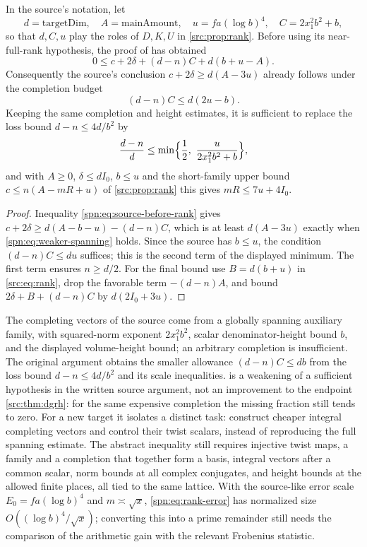\begin{proposition}\label{spn:prop:weakening}
In the source's notation, let
\[
 d=\mathrm{targetDim},\quad A=\mathrm{mainAmount},\quad u=fa(\log b)^4,\quad
 C=2x_1^2b^2+b ,
\]
so that $d,C,u$ play the roles of $D,K,U$ in \cref{src:prop:rank}.
Before using its near-full-rank hypothesis, the proof of
\textup{} has obtained
\begin{equation}\label{spn:eq:source-before-rank}
 0\le c+2\delta+(d-n)C+d(b+u-A).
\end{equation}
Consequently the source's conclusion $c+2\delta\ge d(A-3u)$ already follows
under the completion budget
\begin{equation}\label{spn:eq:weaker-spanning}
 (d-n)C\le d(2u-b).
\end{equation}
Keeping the same completion and height estimates, it is sufficient to replace
the loss bound $d-n\le4d/b^2$ by
\[
 \frac{d-n}{d}\le\min\Bigl\{\frac12,\ \frac{u}{2x_1^2b^2+b}\Bigr\},
\]
and with $A\ge0$, $\delta\le dI_0$, $b\le u$ and the short-family upper bound
$c\le n(A-mR+u)$ of \cref{src:prop:rank} this gives $mR\le7u+4I_0$.
\end{proposition}

\begin{proof}
Inequality \eqref{spn:eq:source-before-rank} gives
$c+2\delta\ge d(A-b-u)-(d-n)C$, which is at least $d(A-3u)$ exactly when
\eqref{spn:eq:weaker-spanning} holds. Since the source has $b\le u$, the
condition $(d-n)C\le du$ suffices; this is the second term of the displayed
minimum. The first term ensures $n\ge d/2$. For the final bound use
$B=d(b+u)$ in \eqref{src:eq:rank}, drop the favorable term $-(d-n)A$, and
bound $2\delta+B+(d-n)C$ by $d(2I_0+3u)$.
\end{proof}

The completing vectors of the source come from a globally spanning auxiliary
family, with squared-norm exponent $2x_1^2b^2$, scalar denominator-height
bound $b$, and the displayed volume-height bound; an arbitrary completion is
insufficient. The original argument obtains the smaller allowance
$(d-n)C\le db$ from the loss bound $d-n\le4d/b^2$ and its scale inequalities.
 is a weakening of a sufficient hypothesis in the
written source argument, not an improvement to the endpoint
\cref{src:thm:dgrh}: for the same expensive completion the missing fraction
still tends to zero. For a new target it isolates a distinct task: construct
cheaper integral completing vectors and control their twist scalars, instead
of reproducing the full spanning estimate. The abstract inequality still
requires injective twist maps, a family and a completion that together form a
basis, integral vectors after a common scalar, norm bounds at all complex
conjugates, and height bounds at the allowed finite places, all tied to the
same lattice. With the source-like error scale $E_0=fa(\log b)^4$ and
$m\asymp\sqrt x$, \eqref{spn:eq:rank-error} has normalized size
$O((\log b)^4/\sqrt x)$; converting this into a prime remainder still needs
the comparison of the arithmetic gain with the relevant Frobenius statistic.

